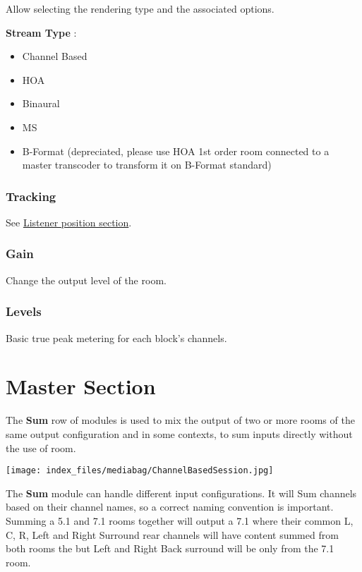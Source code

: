 \documentclass[
  letterpaper,
  DIV=11,
  numbers=noendperiod]{scrreport}
\providecommand{\tightlist}{%
  \setlength{\itemsep}{0pt}\setlength{\parskip}{0pt}}\usepackage{longtable,booktabs,array}
\begin{document}
Allow selecting the rendering type and the associated options.

\textbf{Stream Type} :

\begin{itemize}
\tightlist
\item
  Channel Based
\item
  HOA
\item
  Binaural
\item
  MS
\item
  B-Format (depreciated, please use HOA 1st order room connected to a
  master transcoder to transform it on B-Format standard)
\end{itemize}

\hypertarget{tracking-1}{%
\subsection{Tracking}\label{tracking-1}}

See \href{Spatialisation_Technology_Listener_Position.md}{Listener
position section}.

\hypertarget{gain-1}{%
\subsection{Gain}\label{gain-1}}

Change the output level of the room.

\hypertarget{levels-2}{%
\subsection{Levels}\label{levels-2}}

Basic true peak metering for each block's channels.

\hypertarget{master-section}{%
\chapter{Master Section}\label{master-section}}

The \textbf{Sum} row of modules is used to mix the output of two or more
rooms of the same output configuration and in some contexts, to sum
inputs directly without the use of room.

\texttt{[image: index\_files/mediabag/ChannelBasedSession.jpg]}

The \textbf{Sum} module can handle different input configurations. It
will Sum channels based on their channel names, so a correct naming
convention is important. Summing a 5.1 and 7.1 rooms together will
output a 7.1 where their common L, C, R, Left and Right Surround rear
channels will have content summed from both rooms the but Left and Right
Back surround will be only from the 7.1 room.
\end{document}

